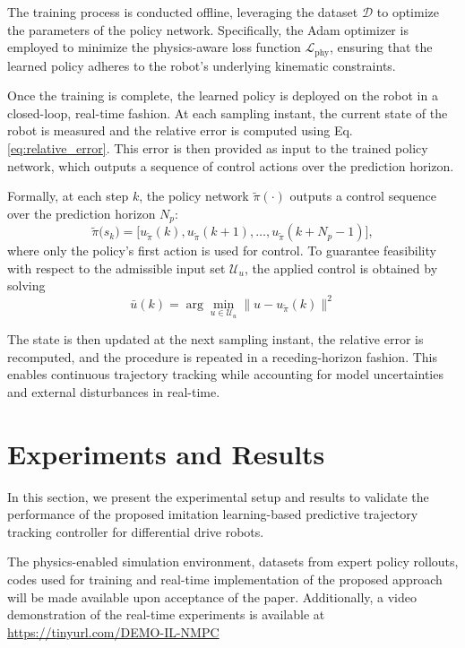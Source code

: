 \documentclass[letterpaper, 10 pt, conference]{ieeeconf}
\begin{document}
The training process is conducted offline, leveraging the dataset $\mathcal{D}$ to optimize the parameters of the policy network. Specifically, the Adam optimizer is employed to minimize the physics-aware loss function $\mathcal{L}_{\text{phy}}$, ensuring that the learned policy adheres to the robot's underlying kinematic constraints.

Once the training is complete, the learned policy is deployed on the robot in a closed-loop, real-time fashion. At each sampling instant, the current state of the robot is measured and the relative error is computed using Eq. \eqref{eq:relative_error}. This error is then provided as input to the trained policy network, which outputs a sequence of control actions over the prediction horizon.

Formally, at each step $k$, the policy network $\tilde{\pi}(\cdot)$ outputs a control sequence over the prediction horizon $N_p$:
\begin{equation}
  \tilde{\pi}\big(s_k\big) = \big[u_{\tilde{\pi}}(k), u_{\tilde{\pi}}(k+1), \dots, u_{\tilde{\pi}}(k+N_p-1)\big],
\end{equation}
where only the policy's first action is used for control. To guarantee feasibility with respect to the admissible input set $\mathcal{U}_u$, the applied control is obtained by solving
\begin{equation}
  \bar{u}(k) = \arg\min_{u \in \mathcal{U}_u} \|u - u_{\tilde{\pi}}(k)\|^2
\end{equation}

The state is then updated at the next sampling instant, the relative error is recomputed, and the procedure is repeated in a receding-horizon fashion. This enables continuous trajectory tracking while accounting for model uncertainties and external disturbances in real-time.

\section{Experiments and Results}

In this section, we present the experimental setup and results to validate the performance of the proposed imitation learning-based predictive trajectory tracking controller for differential drive robots.

The physics-enabled simulation environment, datasets from expert policy rollouts, codes used for training and real-time implementation of the proposed approach will be made available upon acceptance of the paper. Additionally, a video demonstration of the real-time experiments is available at \url{https://tinyurl.com/DEMO-IL-NMPC}
\end{document}
